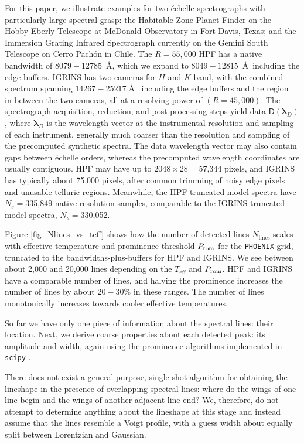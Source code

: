 \documentclass[twocolumn]{aastex631}
\begin{document}
For this paper, we illustrate examples for two \'echelle spectrographs with particularly large spectral grasp: the Habitable Zone Planet Finder \citep[HPF,][]{2014SPIE.9147E..1GM} on the Hobby-Eberly Telescope at McDonald Observatory in Fort Davis, Texas; and the Immersion Grating Infrared Spectrograph \citep[IGRINS,][]{park14}
currently on the Gemini South Telescope on Cerro Pach\'on in Chile. The $R=55,000$ HPF has a native bandwidth of $8079-12785$~\AA, which we expand to $8049-12815$~\AA~including the edge buffers. IGRINS has two cameras for $H$ and $K$ band, with the combined spectrum spanning $14267-25217\;$\AA~ including the edge buffers and the region in-between the two cameras, all at a resolving power of $(R=45,000)$. The spectrograph acquisition, reduction, and post-processing steps yield data $\mathsf{D}(\bm{\lambda}_{D})$, where $\bm{\lambda}_{D}$ is the wavelength vector at the instrumental resolution and sampling of each instrument, generally much coarser than the resolution and sampling of the precomputed synthetic spectra. The data wavelength vector may also contain gaps between \'echelle orders, whereas the precomputed wavelength coordinates are usually contiguous. HPF may have up to $2048\times28=$57,344 pixels, and IGRINS has typically about 75,000 pixels, after common trimming of noisy edge pixels and unusable telluric regions.  Meanwhile, the HPF-truncated model spectra have $N_s=$335,849 native resolution samples, comparable to the IGRINS-truncated model spectra, $N_s=$330,052.

Figure \ref{fig_Nlines_vs_teff} shows how the number of detected lines $N_{\mathrm{lines}}$ scales with effective temperature and prominence threshold $P_{\rm rom}$ for the \texttt{PHOENIX} grid, truncated to the bandwidths-plus-buffers for HPF and IGRINS. We see between about 2,000 and 20,000 lines depending on the $T_{\mathrm{eff}}$ and $P_{\rm rom}$. HPF and IGRINS have a comparable number of lines, and halving the prominence increases the number of lines by about $20-30\%$ in these ranges. The number of lines monotonically increases towards cooler effective temperatures.

So far we have only one piece of information about the spectral lines: their location. Next, we derive coarse properties about each detected peak: its amplitude and width, again using the prominence algorithms implemented in \texttt{scipy} \citep{2020SciPy-NMeth}.

There does not exist a general-purpose, single-shot algorithm for obtaining the lineshape in the presence of overlapping spectral lines: where do the wings of one line begin and the wings of another adjacent line end? We, therefore, do not attempt to determine anything about the lineshape at this stage and instead assume that the lines resemble a Voigt profile, with a guess width about equally split between Lorentzian and Gaussian.
\end{document}
